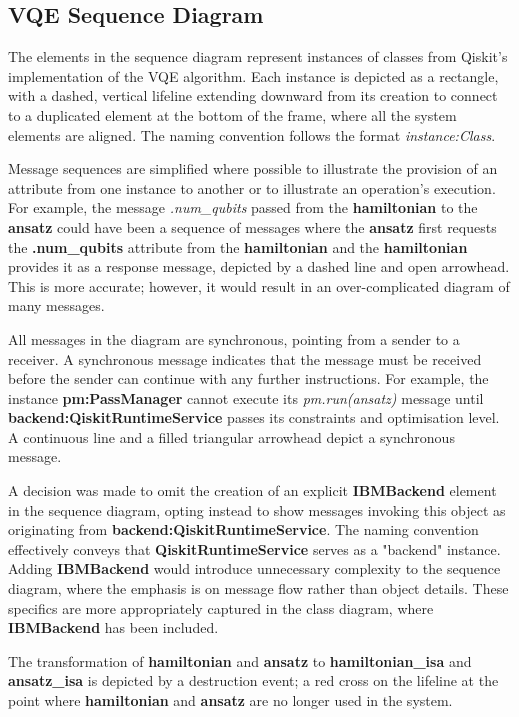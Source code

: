 \documentclass{article}
\begin{document}
\subsection{VQE Sequence Diagram}

The elements in the sequence diagram represent instances of classes from Qiskit’s implementation of the VQE algorithm. Each instance is depicted as a rectangle, with a dashed, vertical lifeline extending downward from its creation to connect to a duplicated element at the bottom of the frame, where all the system elements are aligned. The naming convention follows the format \textit{instance:Class}.

Message sequences are simplified where possible to illustrate the provision of an attribute from one instance to another or to illustrate an operation's execution. For example, the message \textit{.num\_qubits} passed from the \textbf{hamiltonian} to the \textbf{ansatz} could have been a sequence of messages where the \textbf{ansatz} first requests the \textbf{.num\_qubits} attribute from the \textbf{hamiltonian} and the \textbf{hamiltonian} provides it as a response message, depicted by a dashed line and open arrowhead. This is more accurate; however, it would result in an over-complicated diagram of many messages. 

All messages in the diagram are synchronous, pointing from a sender to a receiver. A synchronous message indicates that the message must be received before the sender can continue with any further instructions\cite{Seidl_Scholz_Huemer_Kappel_Duffy_2014}. For example, the instance \textbf{pm:PassManager} cannot execute its \textit{pm.run(ansatz)} message until \textbf{backend:QiskitRuntimeService} passes its constraints and optimisation level. A continuous line and a filled triangular arrowhead depict a synchronous message.

A decision was made to omit the creation of an explicit \textbf{IBMBackend} element in the sequence diagram, opting instead to show messages invoking this object as originating from \textbf{backend:QiskitRuntimeService}.
The naming convention effectively conveys that \textbf{QiskitRuntimeService} serves as a "backend" instance. Adding \textbf{IBMBackend} would introduce unnecessary complexity to the sequence diagram, where the emphasis is on message flow rather than object details. These specifics are more appropriately captured in the class diagram, where \textbf{IBMBackend} has been included.

The transformation of \textbf{hamiltonian} and \textbf{ansatz} to \textbf{hamiltonian\_isa} and \textbf{ansatz\_isa} is depicted by a destruction event; a red cross on the lifeline at the point where \textbf{hamiltonian} and \textbf{ansatz} are no longer used in the system.
\end{document}
